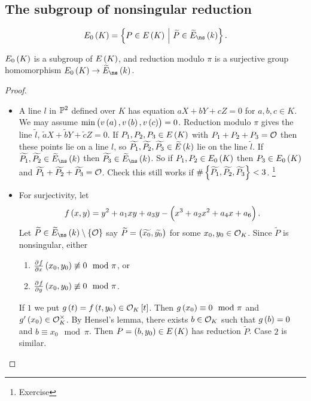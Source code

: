 \subsection{The subgroup of nonsingular reduction}


\begin{definition*}
$$ E_0\br{K} = \cbr{P \in E\br{K} \st \widetilde{P} \in \widetilde{E}_{\ns}\br{k}}. $$
\end{definition*}

\begin{proposition}
\label{prop:9.5}
$ E_0\br{K} $ is a subgroup of $ E\br{K} $, and reduction modulo $ \pi $ is a surjective group homomorphism $ E_0\br{K} \to \widetilde{E}_{\ns}\br{k} $.
\end{proposition}

\begin{proof}
\hfill
\begin{itemize}
\item A line $ l $ in $ \mathbb{P}^2 $ defined over $ K $ has equation $ aX + bY + cZ = 0 $ for $ a, b, c \in K $. We may assume $ \min\br{v\br{a}, v\br{b}, v\br{c}} = 0 $. Reduction modulo $ \pi $ gives the line $ \widetilde{l} $, $ \widetilde{a}X + \widetilde{b}Y + \widetilde{c}Z = 0 $. If $ P_1, P_2, P_3 \in E\br{K} $ with $ P_1 + P_2 + P_3 = \mathcal{O} $ then these points lie on a line $ l $, so $ \widetilde{P_1}, \widetilde{P_2}, \widetilde{P_3} \in \widetilde{E}\br{k} $ lie on the line $ \widetilde{l} $. If $ \widetilde{P_1}, \widetilde{P_2} \in \widetilde{E}_{\ns}\br{k} $ then $ \widetilde{P_3} \in \widetilde{E}_{\ns}\br{k} $. So if $ P_1, P_2 \in E_0\br{K} $ then $ P_3 \in E_0\br{K} $ and $ \widetilde{P_1} + \widetilde{P_2} + \widetilde{P_3} = \mathcal{O} $. Check this still works if $ \#\cbr{\widetilde{P_1}, \widetilde{P_2}, \widetilde{P_3}} < 3 $. \footnote{Exercise}

\pagebreak

\item For surjectivity, let
$$ f\br{x, y} = y^2 + a_1xy + a_3y - \br{x^3 + a_2x^2 + a_4x + a_6}. $$
Let $ \widetilde{P} \in \widetilde{E}_{\ns}\br{k} \setminus \cbr{\OOO} $ say $ \widetilde{P} = \br{\widetilde{x_0}, \widetilde{y_0}} $ for some $ x_0, y_0 \in \mathcal{O}_K $. Since $ \widetilde{P} $ is nonsingular, either
\begin{enumerate}
\item $ \tpd{f}{x}\br{x_0, y_0} \not\equiv 0 \mod \pi $, or
\item $ \tpd{f}{y}\br{x_0, y_0} \not\equiv 0 \mod \pi $.
\end{enumerate}
If $ 1 $ we put $ g\br{t} = f\br{t, y_0} \in \OOO_K\sbr{t} $. Then $ g\br{x_0} \equiv 0 \mod \pi $ and $ g'\br{x_0} \in \OOO_K^\times $. By Hensel's lemma, there exists $ b \in \mathcal{O}_K $ such that $ g\br{b} = 0 $ and $ b \equiv x_0 \mod \pi $. Then $ P = \br{b, y_0} \in E\br{K} $ has reduction $ \widetilde{P} $. Case $ 2 $ is similar.
\end{itemize}
\end{proof}

